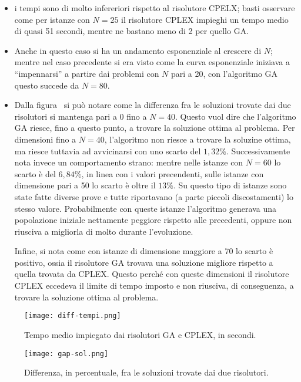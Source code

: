 \begin{itemize}
	\item i tempi sono di molto infereriori rispetto al risolutore CPELX;
	basti osservare come per istanze con $N=25$ il risolutore CPLEX impieghi un tempo medio di quasi 51 secondi,
	mentre ne bastano meno di 2 per quello GA.
	\item Anche in questo caso si ha un andamento esponenziale al crescere di $N$;
	mentre nel caso precedente si era visto come la curva esponenziale iniziava a ``impennarsi'' a partire dai
	problemi con $N$ pari a 20, con l'algoritmo GA questo succede da $N=80$.
	\item Dalla figura~\label{fig:gap-sol} si può notare come la differenza fra le soluzioni trovate dai due
	risolutori si mantenga pari a 0 fino a $N=40$. Questo vuol dire che l'algoritmo GA riesce, fino a questo punto,
	a trovare la soluzione ottima al problema.
	Per dimensioni fino a $N=40$, l'algoritmo non riesce a trovare la soluzine ottima, ma riesce tuttavia
	ad avvicinarsi con uno scarto del $1,32\%$.
	Successivamente nota invece un comportamento strano:
	mentre nelle istanze con $N=60$ lo scarto è del $6,84\%$, in linea con i valori precendenti,
	sulle istanze con dimensione pari a 50 lo scarto è oltre il $13\%$.
	Su questo tipo di istanze sono state fatte diverse prove e tutte riportavano (a parte piccoli discostamenti)
	lo stesso valore. Probabilmente con queste istanze l'algoritmo generava una popolazione iniziale
	nettamente peggiore rispetto alle precedenti, oppure non riusciva a migliorla di molto durante l'evoluzione.

	Infine, si nota come con istanze di dimensione maggiore a 70 lo scarto è positivo, ossia il risolutore
	GA trovava una soluzione migliore rispetto a quella trovata da CPLEX.
	Questo perché con queste dimensioni il risolutore CPLEX eccedeva il limite di tempo imposto e non riusciva,
	di conseguenza, a trovare la soluzione ottima al problema.
\end{itemize}
%
\begin{figure}[!h]
\begin{center}
	\texttt{[image: diff-tempi.png]}
{\scriptsize \caption{Tempo medio impiegato dai risolutori GA e CPLEX, in secondi.}
\label{fig:diff-tempi}}
\end{center}
\end{figure}
%
\begin{figure}[!h]
\begin{center}
	\texttt{[image: gap-sol.png]}
{\scriptsize \caption{Differenza, in percentuale, fra le soluzioni trovate dai due risolutori.}
\label{fig:gap-sol}}
\end{center}
\end{figure}
%
